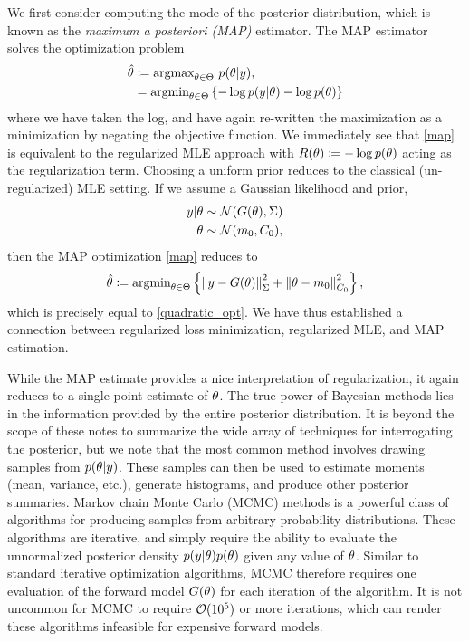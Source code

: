 \documentclass[12pt]{article}
\begin{document}
We first consider computing the mode of the posterior distribution, which is known as the 
\textit{maximum a posteriori (MAP)} estimator. The MAP estimator solves the optimization problem 
\begin{align}
\hat{\theta} &\coloneqq \text{argmax}_{\theta \in \Theta} \ p(\theta | y), \nonumber \\
&= \text{argmin}_{\theta \in \Theta} \left\{-\log p(y | \theta) - \log p(\theta) \right\} \label{map}
\end{align}
where we have taken the log, and have again re-written the maximization as a minimization by negating the objective function. 
We immediately see that \ref{map} is equivalent to the regularized MLE approach with $R(\theta) \coloneqq -\log p(\theta)$ acting as the regularization term.
Choosing a uniform prior reduces to the classical (un-regularized) MLE setting. If we assume a Gaussian likelihood and prior, 
\begin{align*}
y | \theta &\sim \mathcal{N}(G(\theta), \Sigma) \\
\theta &\sim \mathcal{N}(m_0, C_0), 
\end{align*} 
then the MAP optimization \ref{map} reduces to 
\begin{align}
\hat{\theta} \coloneqq \text{argmin}_{\theta \in \Theta} \left\{\left\lVert y - G(\theta)\right\rVert^2_{\Sigma} + \left\lVert\theta - m_0\right\rVert_{C_0}^2\right\}, 
\end{align}
which is precisely equal to \ref{quadratic_opt}. We have thus established a connection between regularized loss minimization, regularized 
MLE, and MAP estimation. 

While the MAP estimate provides a nice interpretation of regularization, it again reduces to a single point estimate of $\theta$. The true 
power of Bayesian methods lies in the information provided by the entire posterior distribution. It is beyond the scope of these notes to 
summarize the wide array of techniques for interrogating the posterior, but we note that the most common method involves drawing 
samples from $p(\theta | y)$. These samples can then be used to estimate moments (mean, variance, etc.), generate histograms, 
and produce other posterior summaries. Markov chain Monte Carlo (MCMC) methods is a powerful class of algorithms for producing 
samples from arbitrary probability distributions. These algorithms are iterative, and simply require the ability to evaluate the 
unnormalized posterior density $p(y | \theta) p(\theta)$ given any value of $\theta$. Similar to standard iterative optimization algorithms, 
MCMC therefore requires one evaluation of the forward model $G(\theta)$ for each iteration of the algorithm. It is not uncommon for 
MCMC to require $\mathcal{O}(10^5)$ or more iterations, which can render these algorithms infeasible for expensive forward models. 
\end{document}

